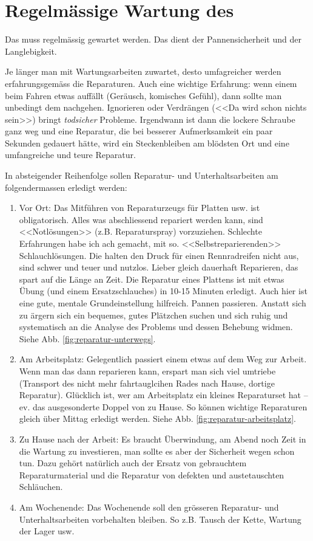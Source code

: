 \section{Regelmässige Wartung des \rv}

Das \rv{} muss regelmässig gewartet werden. Das dient der Pannensicherheit und der Langlebigkeit.

Je länger man mit Wartungsarbeiten zuwartet, desto umfagreicher werden
erfahrungsgemäss die Reparaturen. Auch eine wichtige Erfahrung: wenn einem
beim Fahren etwas auffällt (Geräusch, komisches Gefühl), dann sollte man
unbedingt dem nachgehen. Ignorieren oder Verdrängen (<<Da wird schon nichts
sein>>) bringt \emph{todsicher} Probleme. Irgendwann ist dann die lockere
Schraube ganz weg und eine Reparatur, die bei besserer Aufmerksamkeit ein paar
Sekunden gedauert hätte, wird ein Steckenbleiben am blödsten Ort und eine
umfangreiche und teure Reparatur.

In absteigender Reihenfolge sollen Reparatur- und Unterhaltsarbeiten am \rv{} folgendermassen 
erledigt werden:

\begin{enumerate}
  \item Vor Ort:
    Das Mitführen von Reparaturzeugs für Platten usw. ist obligatorisch.
    Alles was abschliessend repariert werden kann, sind <<Notlösungen>> (z.B. Reparaturspray) vorzuziehen.
    Schlechte Erfahrungen habe ich ach gemacht, mit so. <<Selbstreparierenden>> Schlauchlösungen.
    Die halten den Druck für einen Rennradreifen nicht aus, sind schwer und teuer und nutzlos.
    Lieber gleich dauerhaft Reparieren, das spart auf die Länge an Zeit.
    Die Reparatur eines Plattens ist mit etwas Übung (und einem Ersatzschlauches) in 10-15 Minuten
    erledigt. Auch hier ist eine gute, mentale Grundeinstellung hilfreich.
    Pannen passieren. Anstatt sich zu ärgern sich ein bequemes, gutes Plätzchen suchen und sich
    ruhig und systematisch an die Analyse des Problems und dessen Behebung widmen.
    Siehe Abb. \ref{fig:reparatur-unterwegs}.
  \item Am Arbeitsplatz:
    Gelegentlich passiert einem etwas auf dem Weg zur Arbeit. Wenn man das \rv
    dann reparieren kann, erspart man sich viel umtriebe (Transport des nicht
    mehr fahrtauglcihen Rades nach Hause, dortige Reparatur).
    Glücklich ist, wer am Arbeitsplatz ein kleines Reparaturset hat -- ev. das ausgesonderte
    Doppel von zu Hause. So können wichtige Reparaturen gleich über Mittag erledigt werden.
    Siehe Abb. \ref{fig:reparatur-arbeitsplatz}.
  \item Zu Hause nach der Arbeit:
    Es braucht Überwindung, am Abend noch Zeit in die Wartung zu investieren, man sollte es
    aber der Sicherheit wegen schon tun.
    Dazu gehört natürlich auch der Ersatz von gebrauchtem Reparaturmaterial und die Reparatur
    von defekten und austetauschten Schläuchen.
  \item Am Wochenende:
    Das Wochenende soll den grösseren Reparatur- und Unterhaltsarbeiten vorbehalten bleiben.
    So z.B. Tausch der Kette, Wartung der Lager usw.
\end{enumerate}

